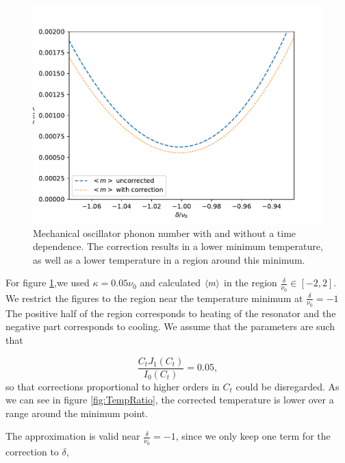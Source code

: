 \documentclass[reprint, amsmath,amssymb, aps,pra]{revtex4-1}
\begin{document}
\begin{figure}[h!]
\includegraphics[scale=.5]{TempGorden1.pdf}   
\caption{ Mechanical oscillator phonon number with and without a time dependence. The correction results in a lower minimum temperature, as well as a lower temperature in a region around this minimum.}\label{fig:TempComparisson}
\end{figure}

For figure \ref{fig:TempComparisson},we used $\kappa = 0.05\nu_0$ and calculated $\expval{m}$ in the region $\frac{\delta}{\nu_0}\in [-2,2]$. We restrict the figures to the region near the temperature minimum at $\frac{\delta}{\nu_0}=-1$ The positive half of the region corresponds to heating of the resonator and the negative part corresponds to cooling. We assume that the parameters are such that

\begin{equation}
\frac{C_tJ_1(C_t)}{I_0(C_t)} = 0.05,
\end{equation}
so that corrections proportional to higher orders in $C_t$ could be
disregarded. As we can see in figure \ref{fig:TempRatio}, the
corrected temperature is lower over a range around the minimum point.

 The approximation is valid
near $\frac{\delta}{\nu_0} = -1$, since we only keep one term for the
correction to $\delta$,  
\end{document}
